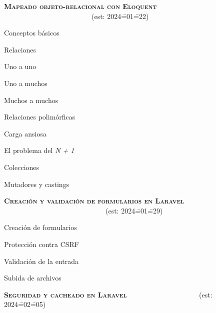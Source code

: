 \begin{longenum}
\begin{longenum}
    \end{longenum}
    \item \textbf{\textsc{Mapeado objeto-relacional con Eloquent}} \ \ \ \ \ \ \ \ \ \ \ \ \ \ \ \ \ \ \ \ \ \ \ \ \ (est: 2024\==01\==22)
    \begin{longenum}
        \item Conceptos básicos
        \item Relaciones
        \begin{longenum}
            \item Uno a uno
            \item Uno a muchos
            \item Muchos a muchos
            \item Relaciones polimórficas
            \item Carga ansiosa
            \begin{longenum}
                \item El problema del \textit{N + 1}
            \end{longenum}
        \end{longenum}
        \item Colecciones
        \item Mutadores y castings
    \end{longenum}
    \item \textbf{\textsc{Creación y validación de formularios en Laravel}} \ \ \ \ \ \ \ \ \ \ \ \ \ \ \ \ \ \ \ \ \ \ \ \ \ \ \ \ \ (est: 2024\==01\==29)
    \begin{longenum}
        \item Creación de formularios
        \item Protección contra CSRF
        \item Validación de la entrada
        \item Subida de archivos
    \end{longenum}
    \item \textbf{\textsc{Seguridad y cacheado en Laravel}} \ \ \ \ \ \ \ \ \ \ \ \ \ \ \ \ \ \ \ \ (est: 2024\==02\==05)

\end{longenum}
